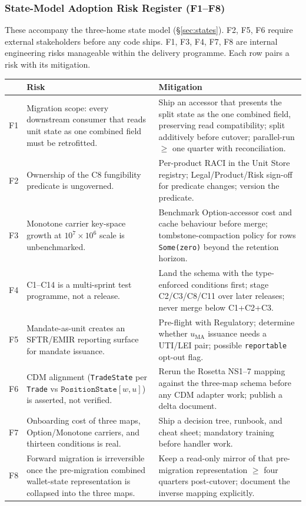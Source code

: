 \subsubsection{State-Model Adoption Risk Register (F1--F8)}

These accompany the three-home state model (\S\ref{sec:states}). F2, F5, F6 require external stakeholders before any code ships. F1, F3, F4, F7, F8 are internal engineering risks manageable within the delivery programme. Each row pairs a risk with its mitigation.

\begin{longtable}{@{}p{0.5cm}p{6.3cm}p{6.3cm}@{}}
\toprule
& \textbf{Risk} & \textbf{Mitigation} \\
\midrule
\endhead
F1 & Migration scope: every downstream consumer that reads unit state as one combined field must be retrofitted. & Ship an accessor that presents the split state as the one combined field, preserving read compatibility; split additively before cutover; parallel-run $\geq$ one quarter with reconciliation. \\
F2 & Ownership of the C8 fungibility predicate is ungoverned. & Per-product RACI in the Unit Store registry; Legal/Product/Risk sign-off for predicate changes; version the predicate. \\
F3 & Monotone carrier key-space growth at $10^7\times10^6$ scale is unbenchmarked. & Benchmark Option-accessor cost and cache behaviour before merge; tombstone-compaction policy for rows \texttt{Some(zero)} beyond the retention horizon. \\
F4 & C1--C14 is a multi-sprint test programme, not a release. & Land the schema with the type-enforced conditions first; stage C2/C3/C8/C11 over later releases; never merge below C1+C2+C3. \\
F5 & Mandate-as-unit creates an SFTR/EMIR reporting surface for mandate issuance. & Pre-flight with Regulatory; determine whether $u_{\mathrm{MA}}$ issuance needs a UTI/LEI pair; possible \texttt{reportable} opt-out flag. \\
F6 & CDM alignment (\texttt{TradeState} per \texttt{Trade} vs $\texttt{PositionState}[w,u]$) is asserted, not verified. & Rerun the Rosetta NS1--7 mapping against the three-map schema before any CDM adapter work; publish a delta document. \\
F7 & Onboarding cost of three maps, Option/Monotone carriers, and thirteen conditions is real. & Ship a decision tree, runbook, and cheat sheet; mandatory training before handler work. \\
F8 & Forward migration is irreversible once the pre-migration combined wallet-state representation is collapsed into the three maps. & Keep a read-only mirror of that pre-migration representation $\geq$ four quarters post-cutover; document the inverse mapping explicitly. \\
\bottomrule
\end{longtable}

